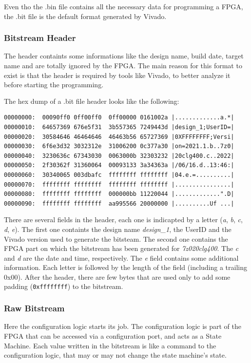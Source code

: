 Even tho the .bin file contains all the necessary data for programming a FPGA, the .bit file is the default format generated by Vivado.

\subsubsection{Bitstream Header}
The header containts some informations like the design name, build date, target name and are totally ignored by the FPGA. The main reason for this format to exist is that the header is required by tools like Vivado, to better analyze it before starting the programming. \bigskip

The hex dump of a .bit file header looks like the following:

\begin{lstlisting}[style=preformatted]
00000000:  00090ff0 0ff00ff0  0ff00000 0161002a |.............a.*|
00000010:  64657369 676e5f31  3b557365 7249443d |design_1;UserID=|
00000020:  30584646 46464646  46463b56 65727369 |0XFFFFFFFF;Versi|
00000030:  6f6e3d32 3032312e  31006200 0c377a30 |on=2021.1.b..7z0|
00000040:  3230636c 67343030  0063000b 32303232 |20clg400.c..2022|
00000050:  2f30362f 31360064  00093133 3a34363a |/06/16.d..13:46:|
00000060:  30340065 003dbafc  ffffffff ffffffff |04.e.=..........|
00000070:  ffffffff ffffffff  ffffffff ffffffff |................|
00000080:  ffffffff ffffffff  000000bb 11220044 |.............".D|
00000090:  ffffffff ffffffff  aa995566 20000000 |..........Uf ...|
\end{lstlisting}

There are several fields in the header, each one is indicapted by a letter (\textit{a}, \textit{b}, \textit{c}, \textit{d}, \textit{e}). The first one containts the design name \textit{design\_1}, the UserID and the Vivado version used to generate the bitsteam. The second one contains the FPGA part on which the bitstream has been generated for \textit{7z020clg400}. The \textit{c} and \textit{d} are the date and time, respectively. The \textit{e} field contains some additional information. Each letter is followed by the length of the field (including a trailing 0x00). After the header, there are few bytes that are used only to add some padding (\texttt{0xffffffff}) to the bitstream. 

\subsubsection{Raw Bitstream}
\label{sec:raw_bitstream}
Here the configuration logic starts its job. The configuration logic is part of the FPGA that can be accessed via a configuration port, and acts as a State Machine. Each value written in the bitstream is like a command to the configuration logic, that may or may not change the state machine's state. \bigskip

